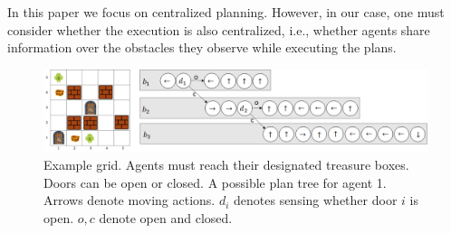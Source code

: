 \documentclass[letterpaper]{article} %
\begin{document}
In this paper we focus on centralized planning. However, in our case, one must consider whether the execution is also centralized, i.e., whether agents share information over the obstacles they observe while executing the plans.




\begin{figure}[t]
    \centering
      \includegraphics[scale=.28]{Figures/ExampleAndPlanTree.png}
      \caption{Example grid. Agents must reach their designated treasure boxes. Doors can be open or closed. A possible plan tree for agent 1. Arrows denote moving actions. $d_i$ denotes sensing whether door $i$ is open. $o,c$ denote open and closed.}
    \label{fig:Example}
\end{figure}
\end{document}

